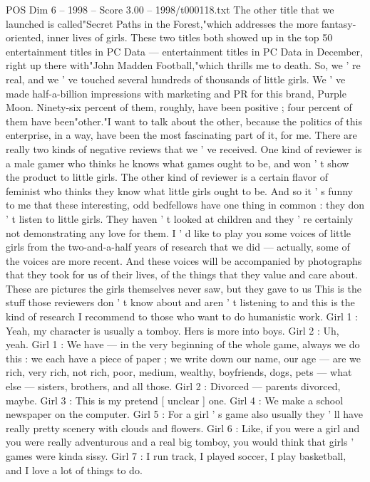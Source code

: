 \begin{textsample}{POS Dim 6 – 1998 – Score 3.00 – 1998/t000118.txt}
The other title that we launched is called"Secret Paths in the Forest,"which addresses the more fantasy-oriented, inner lives of girls.
These two titles both showed up in the top 50 entertainment titles in PC Data — entertainment titles in PC Data in December, right up there with"John Madden Football,"which thrills me to death.
So, we ' re real, and we ' ve touched several hundreds of thousands of little girls.
We ' ve made half-a-billion impressions with marketing and PR for this brand, Purple Moon.
Ninety-six percent of them, roughly, have been positive ; four percent of them have been"other."I want to talk about the other, because the politics of this enterprise, in a way, have been the most fascinating part of it, for me.
There are really two kinds of negative reviews that we ' ve received.
One kind of reviewer is a male gamer who thinks he knows what games ought to be, and won ' t show the product to little girls.
The other kind of reviewer is a certain flavor of feminist who thinks they know what little girls ought to be.
And so it ' s funny to me that these interesting, odd bedfellows have one thing in common : they don ' t listen to little girls.
They haven ' t looked at children and they ' re certainly not demonstrating any love for them.
I ' d like to play you some voices of little girls from the two-and-a-half years of research that we did — actually, some of the voices are more recent.
And these voices will be accompanied by photographs that they took for us of their lives, of the things that they value and care about.
These are pictures the girls themselves never saw, but they gave to us This is the stuff those reviewers don ' t know about and aren ' t listening to and this is the kind of research I recommend to those who want to do humanistic work.
Girl 1 : Yeah, my character is usually a tomboy.
Hers is more into boys.
Girl 2 : Uh, yeah.
Girl 1 : We have — in the very beginning of the whole game, always we do this : we each have a piece of paper ; we write down our name, our age — are we rich, very rich, not rich, poor, medium, wealthy, boyfriends, dogs, pets — what else — sisters, brothers, and all those.
Girl 2 : Divorced — parents divorced, maybe.
Girl 3 : This is my pretend [ unclear ] one.
Girl 4 : We make a school newspaper on the computer.
Girl 5 : For a girl ' s game also usually they ' ll have really pretty scenery with clouds and flowers.
Girl 6 : Like, if you were a girl and you were really adventurous and a real big tomboy, you would think that girls ' games were kinda sissy.
Girl 7 : I run track, I played soccer, I play basketball, and I love a lot of things to do.

\end{textsample}
